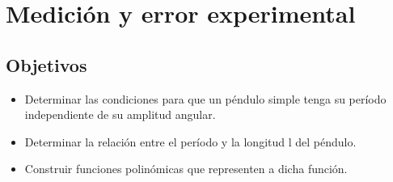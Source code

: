 \section{Medición y error experimental}

\subsection{Objetivos}
\begin{itemize}
	\item Determinar las condiciones para que un péndulo simple tenga su período independiente de su amplitud angular.
	\item Determinar la relación entre el período y la longitud l del péndulo.
	\item Construir funciones polinómicas que representen a dicha función.
\end{itemize}
